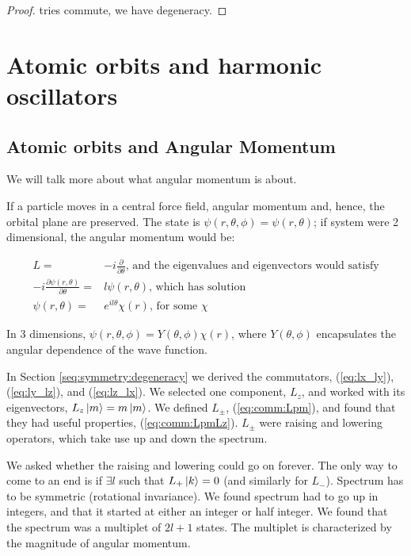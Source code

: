 \documentclass[]{article}
\begin{document}
\begin{proof}
tries commute, we have degeneracy.
\end{proof}

\section{Atomic orbits and harmonic oscillators}

\subsection{Atomic orbits and Angular Momentum}

We will talk more about what angular momentum is about.

If a particle moves in a central force field, angular momentum and, hence, the orbital plane are preserved. The state is $\psi(r,\theta,\phi)= \psi(r,\theta)$; if system were 2 dimensional, the angular momentum would be:

\begin{align*}
L =& -i \frac{\partial}{\partial \theta} \text{, and the eigenvalues and eigenvectors would satisfy}\\
-i \frac{\partial \psi(r,\theta)}{\partial \theta} =& l \psi(r,\theta) \text{, which has solution}\\
\psi(r,\theta) =& e^{i l \theta} \chi(r) \text{, for some $\chi$}
\end{align*}

In 3 dimensions, $\psi(r,\theta,\phi)= Y(\theta,\phi) \chi(r)$, where $Y(\theta,\phi)$ encapsulates the angular dependence of the wave function.

In Section \ref{seq:symmetry:degeneracy} we derived the commutators, (\ref{eq:lx_ly}), (\ref{eq:ly_lz}), and (\ref{eq:lz_lx}). We selected one component, $L_z$, and worked with its eigenvectors, $L_z \ket{m} = m \ket{m}$. We defined $L_\pm$, (\ref{eq:comm:Lpm}), and found that they had useful properties, (\ref{eq:comm:LpmLz}). $L_\pm$ were raising and lowering operators, which take use up and down the spectrum.

We asked whether the raising and lowering could go on forever. The only way to come to an end is if $\exists l$ such that $L_+\ket{k}=0$ (and similarly for $L_-$). Spectrum has to be symmetric (rotational invariance). We found spectrum had to go up in integers, and that it started at either an integer or half integer. We found that the spectrum was a multiplet of $2l+1$ states. The multiplet is characterized by the magnitude of angular momentum.
\end{document}
